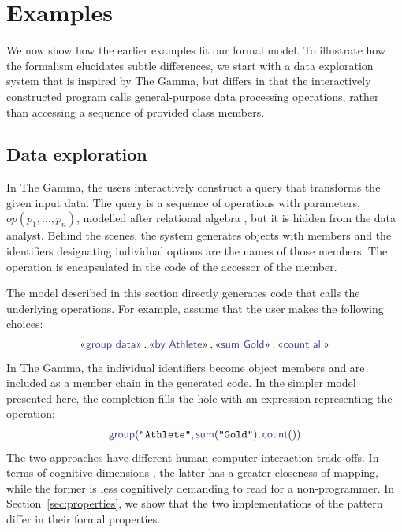 \documentclass[nonacm,anonymous,sigplan,screen]{acmart}
\newcommand{\ident}[1]{\textsf{\color{DarkSlateBlue}{#1}}}
\newcommand{\ddident}[1]{\guillemotleft\ident{#1}\guillemotright}
\newcommand{\op}{\textit{op}}
\begin{document}

\section{Examples}
\label{sec:examples}

We now show how the earlier examples fit our formal model.
%
%
To illustrate how the formalism elucidates subtle differences,
we start with a data exploration system that is inspired by The Gamma, but differs in
that the interactively constructed program calls general-purpose data processing operations,
rather than accessing a sequence of provided class members.


\subsection{Data exploration}
\label{sec:examples-data}

In The Gamma, the users interactively construct a query that transforms the given input data.
The query is a sequence of operations with parameters,
$\op(p_1, \ldots, p_n)$, modelled after relational algebra \cite{codd-1970-relational}, but it
is hidden from the data analyst. Behind the scenes, the system generates
objects with members and the identifiers designating individual options are the names of those
members. The operation is encapsulated in the code of the accessor of the member.

The model described in this section directly generates code that calls the underlying operations.
For example, assume that the user makes the following choices:
\[
\textnormal{\ddident{group data}\,.\,\ddident{by Athlete}\,.\,\ddident{sum Gold}\,.\,\ddident{count all}}
\]
In The Gamma, the individual identifiers become object members and are included as
a member chain in the generated code. In the simpler model presented here, the completion
fills the hole with an expression representing the operation:
\[
\ident{group}(\texttt{"Athlete"}, \ident{sum}(\texttt{"Gold"}), \ident{count}())
\]
The two approaches have different human-computer interaction trade-offs. In terms of cognitive
dimensions \cite{green-1989-cogdims,blackwell-2003-cogdims}, the latter has a greater closeness
of mapping, while the former is less cognitively demanding to read for a non-programmer.
In Section~\ref{sec:properties}, we show that the two implementations of the
pattern differ in their formal properties.
\end{document}
